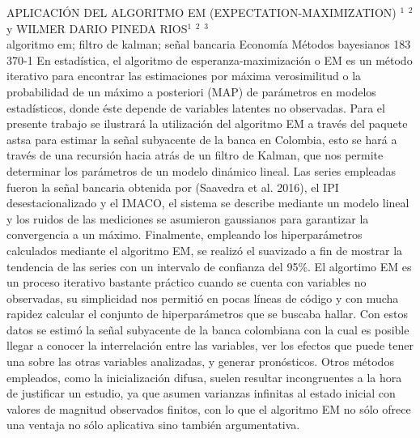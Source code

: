 \A
{APLICACIÓN DEL ALGORITMO EM (EXPECTATION-MAXIMIZATION)}
{$^1$ $^2$ y WILMER DARIO PINEDA RIOS$^1$ $^2$ $^3$}
{
\\}
{algoritmo em; filtro de kalman; señal bancaria} 
 {Economía} 
 {Métodos bayesianos} 
 {183} 
 {370-1}
{En estadística, el algoritmo de esperanza-maximización o EM es un método iterativo para encontrar las estimaciones por máxima verosimilitud o la probabilidad de un máximo a posteriori (MAP) de parámetros en modelos estadísticos, donde éste depende de variables latentes no observadas. Para el presente trabajo se ilustrará la utilización del algoritmo EM a través del paquete astsa para estimar la señal subyacente de la banca en Colombia, esto se hará a través de una recursión hacia atrás de un filtro de Kalman, que nos permite determinar los parámetros de un modelo dinámico lineal. Las series empleadas fueron la señal bancaria obtenida por (Saavedra et al. 2016), el IPI desestacionalizado y el IMACO, el sistema se describe mediante un modelo lineal y los ruidos de las mediciones se asumieron gaussianos para garantizar la convergencia a un máximo. Finalmente, empleando los hiperparámetros calculados mediante el algoritmo EM, se realizó el suavizado a fin de mostrar la tendencia de las series con un intervalo de confianza del 95\%. El algortimo EM es un proceso iterativo bastante práctico cuando se cuenta con variables no observadas, su simplicidad nos permitió en pocas líneas de código y con mucha rapidez calcular el conjunto de hiperparámetros que se buscaba hallar. Con estos datos se estimó la señal subyacente de la banca colombiana con la cual es posible llegar a conocer la interrelación entre las variables, ver los efectos que puede tener una sobre las otras variables analizadas, y generar pronósticos. Otros métodos empleados, como la inicialización difusa, suelen resultar incongruentes a la hora de justificar un estudio, ya que asumen varianzas infinitas al estado inicial con valores de magnitud observados finitos, con lo que el algoritmo EM no sólo ofrece una ventaja no sólo aplicativa sino también argumentativa.}
